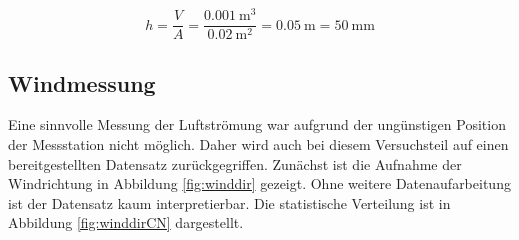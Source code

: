 \begin{equation}
	\label{eq:rain2}
	h = \frac{V}{A} = \frac{\SI{0,001}{\cubic\meter}}{\SI{0,02}{\square\meter}} = \SI{0,05}{\meter} = \SI{50}{\milli\meter}
\end{equation}

\subsection{Windmessung}
Eine sinnvolle Messung der Luftströmung war aufgrund der ungünstigen Position der Messstation nicht möglich. Daher wird auch bei diesem Versuchsteil auf einen bereitgestellten Datensatz zurückgegriffen. Zunächst ist die Aufnahme der Windrichtung in Abbildung \ref{fig:winddir} gezeigt. Ohne weitere Datenaufarbeitung ist der Datensatz kaum interpretierbar. Die statistische Verteilung ist in Abbildung \ref{fig:winddirCN} dargestellt.
